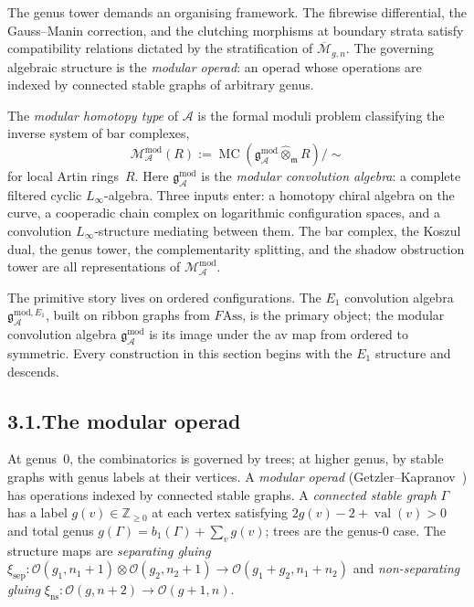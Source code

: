 \documentclass[11pt,reqno]{amsart}
\theoremstyle{definition}
\theoremstyle{remark}
\providecommand{\cA}{\mathcal{A}}
\providecommand{\cM}{\mathcal{M}}
\providecommand{\cO}{\mathcal{O}}
\providecommand{\gAmod}{\mathfrak{g}^{\mathrm{mod}}_\cA}
\providecommand{\Ass}{\mathrm{Ass}}
\numberwithin{equation}{section}
\begin{document}
The genus tower demands an organising framework. The fibrewise
differential, the Gauss--Manin correction, and the clutching morphisms
at boundary strata satisfy compatibility relations dictated by the
stratification of $\overline{\cM}_{g,n}$. The governing algebraic
structure is the \emph{modular operad}: an operad whose operations are
indexed by connected stable graphs of arbitrary genus.

The \emph{modular homotopy type} of $\cA$ is the formal moduli problem
classifying the inverse system of bar complexes,
\[
\mathcal M^{\mathrm{mod}}_\cA(R):=\operatorname{MC}(\mathfrak g^{\mathrm{mod}}_\cA\widehat\otimes_{\mathfrak m}R)/{\sim}
\]
for local Artin rings~$R$. Here $\mathfrak g^{\mathrm{mod}}_\cA$ is
the \emph{modular convolution algebra}: a complete filtered cyclic
$L_\infty$-algebra. Three inputs enter: a homotopy chiral algebra on
the curve, a cooperadic chain complex on logarithmic configuration
spaces, and a convolution $L_\infty$-structure mediating between them.
The bar complex, the Koszul dual, the genus tower, the
complementarity splitting, and the shadow obstruction tower are all
representations of $\mathcal M^{\mathrm{mod}}_\cA$.

The primitive story lives on ordered configurations. The $E_1$
convolution algebra $\mathfrak g^{\mathrm{mod},E_1}_\cA$, built on
ribbon graphs from $F\!\Ass$, is the primary object; the modular
convolution algebra $\gAmod$ is its image under the av map from
ordered to symmetric. Every construction in this section begins with
the $E_1$ structure and descends.

\subsection*{3.1.\enspace The modular operad}

At genus~$0$, the combinatorics is governed by trees; at higher
genus, by stable graphs with genus labels at their vertices. A
\emph{modular operad} (Getzler--Kapranov~\cite{GeK98}) has operations
indexed by connected stable graphs. A \emph{connected stable graph}
$\Gamma$ has a label $g(v)\in\mathbb Z_{\ge 0}$ at each vertex
satisfying $2g(v)-2+\operatorname{val}(v)>0$ and total genus
$g(\Gamma)=b_1(\Gamma)+\sum_v g(v)$; trees are the genus-$0$ case.
The structure maps are \emph{separating gluing}
$\xi_{\mathrm{sep}}\colon\cO(g_1,n_1{+}1)\otimes\cO(g_2,n_2{+}1)\to\cO(g_1{+}g_2,n_1{+}n_2)$
and \emph{non-separating gluing}
$\xi_{\mathrm{ns}}\colon\cO(g,n{+}2)\to\cO(g{+}1,n)$.
\end{document}
